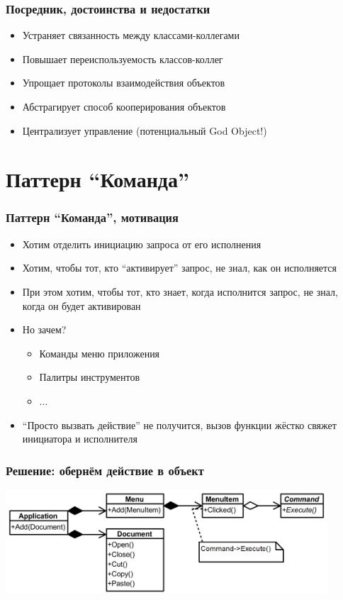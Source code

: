 \documentclass{../../slides-style}
\begin{document}
    \begin{frame}
        \frametitle{Посредник, достоинства и недостатки}
        \begin{itemize}
            \item Устраняет связанность между классами-коллегами
            \item Повышает переиспользуемость классов-коллег
            \item Упрощает протоколы взаимодействия объектов
            \item Абстрагирует способ кооперирования объектов
            \item Централизует управление (потенциальный God Object!)
        \end{itemize}
    \end{frame}

    \section{Паттерн ``Команда''}

    \begin{frame}
        \frametitle{Паттерн ``Команда'', мотивация}
        \begin{itemize}
            \item Хотим отделить инициацию запроса от его исполнения
            \item Хотим, чтобы тот, кто ``активирует'' запрос, не знал, как он исполняется
            \item При этом хотим, чтобы тот, кто знает, когда исполнится запрос, не знал, когда он будет активирован
            \item Но зачем?
            \begin{itemize}
                \item Команды меню приложения
                \item Палитры инструментов
                \item ...
            \end{itemize}
            \item ``Просто вызвать действие'' не получится, вызов функции жёстко свяжет инициатора и исполнителя
        \end{itemize}
    \end{frame}

    \begin{frame}
        \frametitle{Решение: обернём действие в объект}
        \begin{center}
            \includegraphics[width=0.9\textwidth]{commandExample.png}
        \end{center}
    \end{frame}
\end{document}
